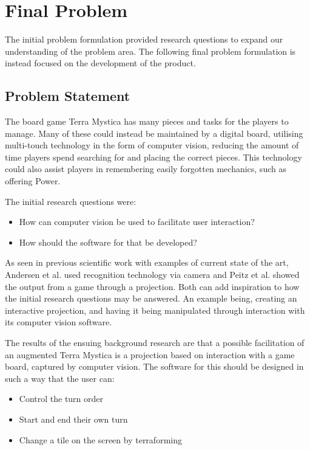 \chapter{Final Problem}\label{ch:finprob}
The initial problem formulation provided research questions to expand our understanding of the problem area. The following final problem formulation is instead focused on the development of the product.

\section{Problem Statement}\label{sec:ProblemStatement}
The board game Terra Mystica has many pieces and tasks for the players to manage. Many of these could instead be maintained by a digital board, utilising multi-touch technology in the form of computer vision, reducing the amount of time players spend searching for and placing the correct pieces. This technology could also assist players in remembering easily forgotten mechanics, such as offering Power.

The initial research questions were:
\begin{itemize}
	\item How can computer vision be used to facilitate user interaction?
	\item How should the software for that be developed?
\end{itemize}

As seen in previous scientific work with examples of current state of the art, Andersen et al. \citep{andersen_designing_2004} used recognition technology via camera and Peitz et al. \citep{peitzWizards2006} showed the output from a game through a projection. Both can add inspiration to how the initial research questions may be answered. An example being, creating an interactive projection, and having it being manipulated through interaction with its computer vision software.

The results of the ensuing background research are that a possible facilitation of an augmented Terra Mystica is a projection based on interaction with a game board, captured by computer vision. The software for this should be designed in such a way that the user can:

\begin{itemize}
\item Control the turn order
\item Start and end their own turn
\item Change a tile on the screen by terraforming
\end{itemize}

